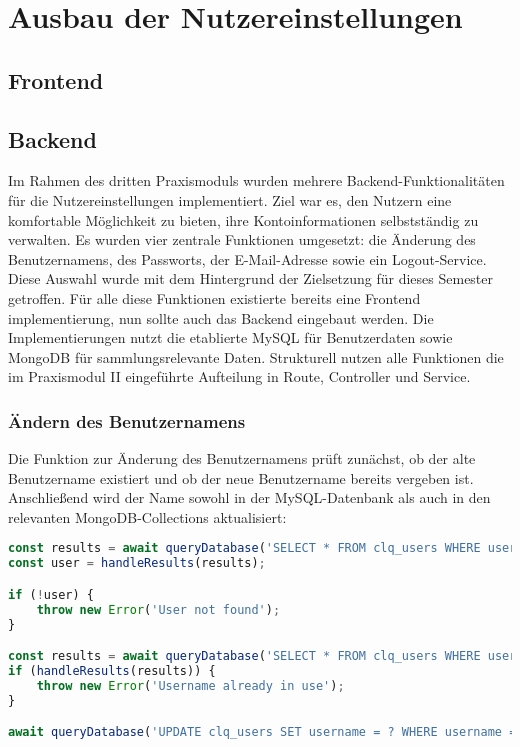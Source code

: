 \section{Ausbau der Nutzereinstellungen}\label{sec:ausbau-der-nutzereinstellungen}

\subsection{Frontend}\label{subsec:frontend}

\subsection{Backend}\label{subsec:backend}

Im Rahmen des dritten Praxismoduls wurden mehrere Backend-Funktionalitäten für die Nutzereinstellungen implementiert.
Ziel war es, den Nutzern eine komfortable Möglichkeit zu bieten, ihre Kontoinformationen selbstständig zu verwalten.
Es wurden vier zentrale Funktionen umgesetzt: die Änderung des Benutzernamens, des Passworts, der E-Mail-Adresse sowie ein Logout-Service.
Diese Auswahl wurde mit dem Hintergrund der Zielsetzung für dieses Semester getroffen.
Für alle diese Funktionen existierte bereits eine Frontend implementierung, nun sollte auch das Backend eingebaut werden.
Die Implementierungen nutzt die etablierte MySQL für Benutzerdaten sowie MongoDB für sammlungsrelevante Daten.
Strukturell nutzen alle Funktionen die im Praxismodul II eingeführte Aufteilung in Route, Controller und Service.

\subsubsection{Ändern des Benutzernamens}\label{subsubsec:username-update}

Die Funktion zur Änderung des Benutzernamens prüft zunächst, ob der alte Benutzername existiert und ob der neue Benutzername bereits vergeben ist.
Anschließend wird der Name sowohl in der MySQL-Datenbank als auch in den relevanten MongoDB-Collections aktualisiert:

\begin{lstlisting}[language=JavaScript, caption=Überprüfung und Update des Usernamens in MySQL]
const results = await queryDatabase('SELECT * FROM clq_users WHERE username = ?', [oldUsername]);
const user = handleResults(results);

if (!user) {
    throw new Error('User not found');
}

const results = await queryDatabase('SELECT * FROM clq_users WHERE username = ?', [newUsername]);
if (handleResults(results)) {
    throw new Error('Username already in use');
}

await queryDatabase('UPDATE clq_users SET username = ? WHERE username = ?', [newUsername, oldUsername]);
\end{lstlisting}

